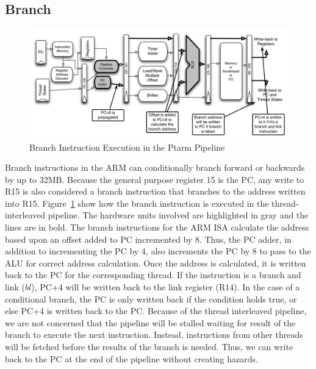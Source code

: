 \subsection{Branch}
\begin{figure}
  \vspace{-20pt}
  \begin{center}
    \includegraphics[scale=.6]{figs/branch_pipeline_implementation}
  \end{center}
  \vspace{-20pt}
  \caption{Branch Instruction Execution in the Ptarm Pipeline}
  \label{fig:branch_pipeline_implementation}
\end{figure}
Branch instructions in the ARM can conditionally branch forward or backwards by up to 32MB. 
Because the general purpose register 15 is the PC, any write to R15 is also considered a branch instruction that branches to the address written into R15.
Figure~\ref{fig:branch_pipeline_implementation} show how the branch instruction is executed in the thread-interleaved pipeline. 
The hardware units involved are highlighted in gray and the lines are in bold.
The branch instructions for the ARM ISA calculate the address based upon an offset added to PC incremented by 8. 
Thus, the PC adder, in addition to incrementing the PC by 4, also increments the PC by 8 to pass to the ALU for correct address calculation. 
Once the address is calculated, it is written back to the PC for the corresponding thread.
If the instruction is a branch and link ($bl$), PC+4 will be written back to the link register (R14).   
In the case of a conditional branch, the PC is only written back if the condition holds true, or else PC+4 is written back to the PC. 
Because of the thread interleaved pipeline, we are not concerned that the pipeline will be stalled waiting for result of the branch to execute the next instruction. 
Instead, instructions from other threads will be fetched before the results of the branch is needed.     
Thus, we can write back to the PC at the end of the pipeline without creating hazards.
